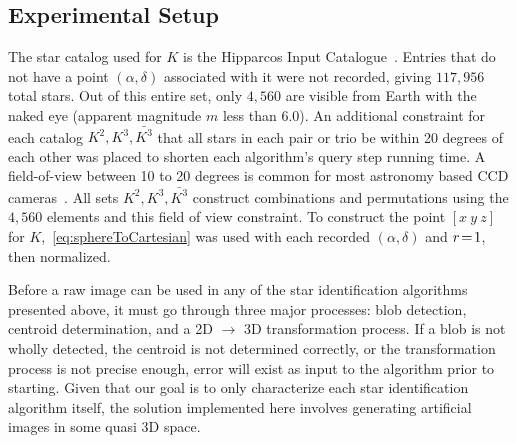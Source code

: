 \documentclass[conference]{IEEEtran}
\begin{document}

    \subsection{Experimental Setup}\label{subsec:experimentalSetup}
    The star catalog used for $K$ is the Hipparcos Input Catalogue~\cite{perryman:hipparcosCatalogue}.
    Entries that do not have a point $\left( \alpha, \delta \right)$ associated with it were not recorded, giving
    $117{,}956$ total stars.
    Out of this entire set, only $4{,}560$ are visible from Earth with the naked eye (apparent magnitude $m$ less than 6.0).
    An additional constraint for each catalog $K^2, K^3, \bar{K^3}$ that all stars in each pair or trio be within 20
    degrees of each other was placed to shorten each algorithm's query step running time.
    A field-of-view between 10 to 20 degrees is common for most astronomy based CCD
    cameras~\cite{mortari:pyramidIdentification}.
    All sets $K^2, K^3, \bar{K^3}$ construct combinations and permutations using the $4{,}560$ elements and this field
    of view constraint.
    To construct the point $[ x \ y \ z ]$ for $K$,~\autoref{eq:sphereToCartesian} was used with
    each recorded $\left(\alpha, \delta \right)$ and $r \!=\! 1$, then normalized.

    Before a raw image can be used in any of the star identification algorithms presented above, it must go through
    three major processes: blob detection, centroid determination, and a 2D $\rightarrow$ 3D transformation process.
    If a blob is not wholly detected, the centroid is not determined correctly, or the transformation process
    is not precise enough, error will exist as input to the algorithm prior to starting.
    Given that our goal is to only characterize each star identification algorithm itself, the solution implemented here
    involves generating artificial images in some quasi 3D space.
\end{document}
